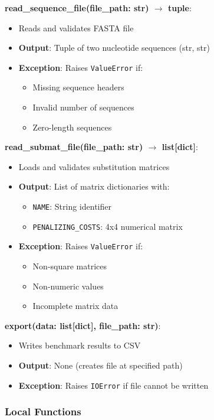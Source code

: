 \documentclass[12pt, titlepage]{article}
\begin{document}
\noindent \textbf{read\_sequence\_file(file\_path: str) $\rightarrow$ tuple}:
\begin{itemize}
    \item Reads and validates FASTA file
    \item \textbf{Output}: Tuple of two nucleotide sequences (str, str)
    \item \textbf{Exception}: Raises \texttt{ValueError} if:
    \begin{itemize}
        \item Missing sequence headers
        \item Invalid number of sequences
        \item Zero-length sequences
    \end{itemize}
\end{itemize}

\noindent \textbf{read\_submat\_file(file\_path: str) $\rightarrow$ list[dict]}:
\begin{itemize}
    \item Loads and validates substitution matrices
    \item \textbf{Output}: List of matrix dictionaries with:
    \begin{itemize}
        \item \texttt{NAME}: String identifier
        \item \texttt{PENALIZING\_COSTS}: 4x4 numerical matrix
    \end{itemize}
    \item \textbf{Exception}: Raises \texttt{ValueError} if:
    \begin{itemize}
        \item Non-square matrices
        \item Non-numeric values
        \item Incomplete matrix data
    \end{itemize}
\end{itemize}

\noindent \textbf{export(data: list[dict], file\_path: str)}:
\begin{itemize}
    \item Writes benchmark results to CSV
    \item \textbf{Output}: None (creates file at specified path)
    \item \textbf{Exception}: Raises \texttt{IOError} if file cannot be written
\end{itemize}

\subsubsection{Local Functions}
\end{document}
